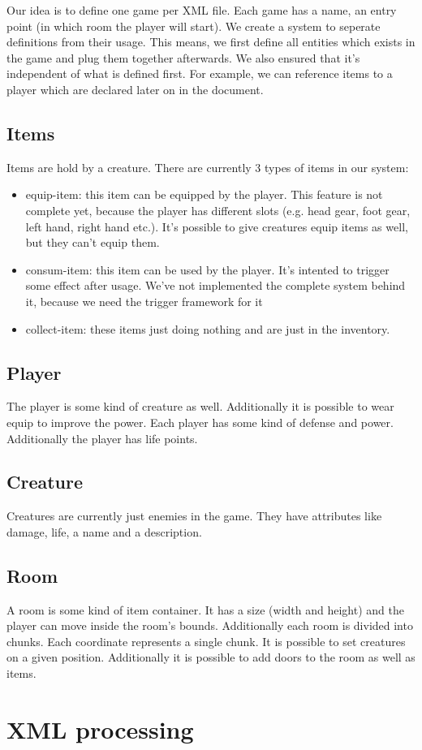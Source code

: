         


Our idea is to define one game per XML file. Each game has a name, an entry point (in which room the player will start). We create a system to seperate definitions from their usage. This means, we first define all entities which exists in the game and plug them together afterwards. We also ensured that it's independent of what is defined first. For example, we can reference items to a player which are declared later on in the document.

\subsection{Items}

Items are hold by a creature. There are currently 3 types of items in our system:

\begin{itemize}
\item equip-item: this item can be equipped by the player. This feature is not complete yet, because the player has different slots (e.g. head gear, foot gear, left hand, right hand etc.). It's possible to give creatures equip items as well, but they can't equip them.
\item consum-item: this item can be used by the player. It's intented to trigger some effect after usage. We've not implemented the complete system behind it, because we need the trigger framework for it
\item collect-item: these items just doing nothing and are just in the inventory. 
\end{itemize}

\subsection{Player}

The player is some kind of creature as well. Additionally it is possible to wear equip to improve the power. Each player has some kind of defense and power. Additionally the player has life points.

\subsection{Creature}

Creatures are currently just enemies in the game. They have attributes like damage, life, a name and a description.

\subsection{Room}

A room is some kind of item container. It has a size (width and height) and the player can move inside the room's bounds. Additionally each room is divided into chunks. Each coordinate represents a single chunk. It is possible to set creatures on a given position. Additionally it is possible to add doors to the room as well as items.

\section{XML processing}